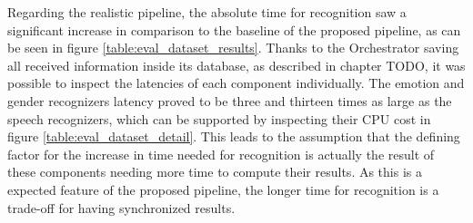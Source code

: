 { %
Regarding the realistic pipeline, the absolute time for recognition saw a significant increase in comparison to the baseline of the proposed pipeline, as can be seen in figure \ref{table:eval_dataset_results}.
Thanks to the Orchestrator saving all received information inside its database, as described in chapter TODO, it was possible to inspect the latencies of each component individually.
The emotion and gender recognizers latency proved to be three and thirteen times as large as the speech recognizers, which can be supported by inspecting their CPU cost in figure \ref{table:eval_dataset_detail}.
This leads to the assumption that the defining factor for the increase in time needed for recognition is actually the result of these components needing more time to compute their results.
As this is a expected feature of the proposed pipeline, the longer time for recognition is a trade-off for having synchronized results.
}

